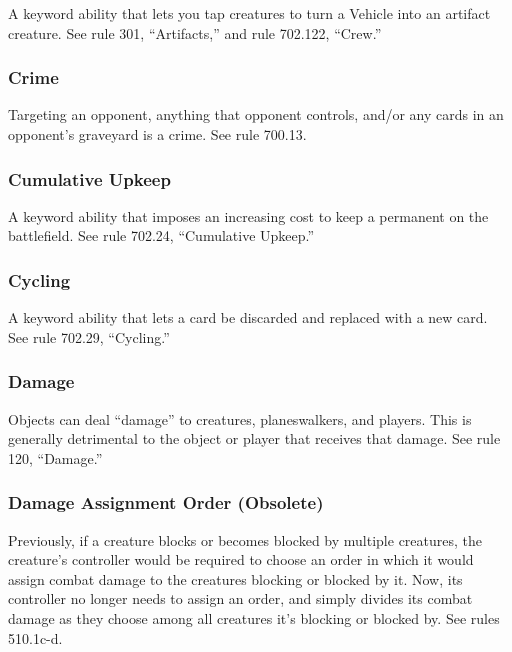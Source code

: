 {{{{{{A keyword ability that lets you tap creatures to turn a Vehicle into an artifact creature. See rule 301, “Artifacts,” and rule 702.122, “Crew.”

\subsubsection*{Crime}

Targeting an opponent, anything that opponent controls, and/or any cards in an opponent’s graveyard is a crime. See rule 700.13.

\subsubsection*{Cumulative Upkeep}

A keyword ability that imposes an increasing cost to keep a permanent on the battlefield. See rule 702.24, “Cumulative Upkeep.”

\subsubsection*{Cycling}

A keyword ability that lets a card be discarded and replaced with a new card. See rule 702.29, “Cycling.”

\subsubsection*{Damage}

Objects can deal “damage” to creatures, planeswalkers, and players. This is generally detrimental to the object or player that receives that damage. See rule 120, “Damage.”

\subsubsection*{Damage Assignment Order (Obsolete)}

Previously, if a creature blocks or becomes blocked by multiple creatures, the creature’s controller would be required to choose an order in which it would assign combat damage to the creatures blocking or blocked by it. Now, its controller no longer needs to assign an order, and simply divides its combat damage as they choose among all creatures it’s blocking or blocked by. See rules 510.1c-d.

}}}}}}
